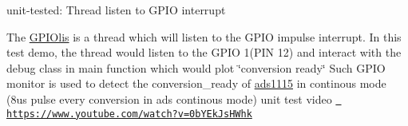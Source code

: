 unit-\/tested\+: Thread listen to G\+P\+IO interrupt

The \mbox{\hyperlink{class_g_p_i_olis}{G\+P\+I\+Olis}} is a thread which will listen to the G\+P\+IO impulse interrupt. In this test demo, the thread would listen to the G\+P\+IO 1(P\+IN 12) and interact with the debug class in main function which would plot \char`\"{}conversion ready\char`\"{} Such G\+P\+IO monitor is used to detect the conversion\+\_\+ready of \mbox{\hyperlink{classads1115}{ads1115}} in continous mode (8us pulse every conversion in ads continous mode) unit test video \href{https://www.youtube.com/watch?v=0bYEkJsHWhk}{\texttt{ https\+://www.\+youtube.\+com/watch?v=0b\+Y\+Ek\+Js\+H\+Whk}} 